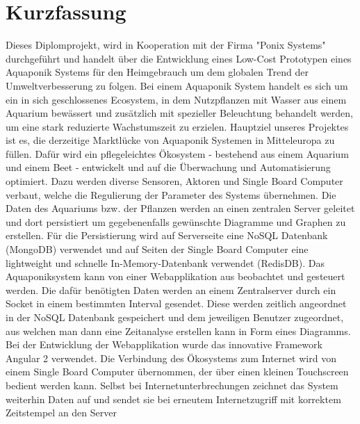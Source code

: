 \section*{Kurzfassung}

Dieses Diplomprojekt, wird in Kooperation mit der Firma "Ponix Systems" durchgef\"uhrt und handelt \"uber die Entwicklung eines Low-Cost Prototypen eines Aquaponik Systems f\"ur den Heimgebrauch um dem globalen Trend der Umweltverbesserung zu folgen. Bei einem Aquaponik System handelt es sich um ein in sich geschlossenes Ecosystem, in dem Nutzpflanzen mit Wasser aus einem Aquarium bewässert und zusätzlich mit spezieller Beleuchtung  behandelt werden, um eine stark reduzierte Wachstumszeit zu erzielen. Hauptziel unseres Projektes ist es, die derzeitige Marktl\"ucke von Aquaponik Systemen in Mitteleuropa zu f\"ullen. Daf\"ur wird ein pflegeleichtes \"Okosystem - bestehend aus einem Aquarium und einem Beet - entwickelt und auf die \"Uberwachung und Automatisierung optimiert. Dazu werden diverse Sensoren, Aktoren und Single Board Computer verbaut, welche die Regulierung der Parameter des Systems \"ubernehmen. Die Daten des Aquariums bzw. der Pflanzen werden an einen zentralen Server geleitet und dort persistiert um gegebenenfalls gew\"unschte Diagramme und Graphen zu erstellen. F\"ur die Persistierung wird auf Serverseite eine NoSQL Datenbank (MongoDB) verwendet und auf Seiten der Single Board Computer eine lightweight und schnelle In-Memory-Datenbank verwendet (RedisDB). 
Das Aquaponiksystem kann von einer Webapplikation aus beobachtet und gesteuert werden. Die dafür benötigten Daten werden an einem Zentralserver durch ein Socket in einem bestimmten Interval gesendet. Diese werden zeitlich angeordnet in der NoSQL Datenbank gespeichert und dem jeweiligen Benutzer zugeordnet, aus welchen man dann eine Zeitanalyse erstellen kann in Form eines Diagramms. Bei der Entwicklung der Webapplikation wurde das innovative Framework Angular 2 verwendet.
Die Verbindung des \"Okosystems zum Internet wird von einem Single Board Computer \"ubernommen, der \"uber einen kleinen Touchscreen bedient werden kann. Selbst bei Internetunterbrechungen zeichnet das System weiterhin Daten auf und sendet sie bei erneutem Internetzugriff mit korrektem Zeitstempel an den Server
